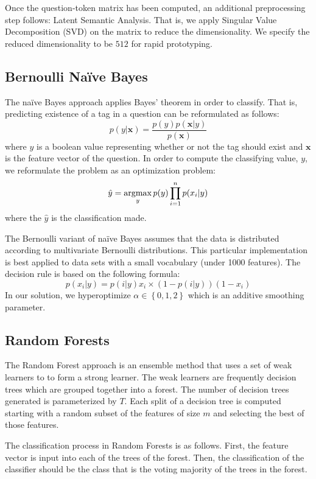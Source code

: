 \documentclass{sig-alternate}
\renewcommand{\vec}[1]{\mathbf{#1}}
\newcommand{\argmax}{\operatornamewithlimits{argmax}}
\begin{document}
		Once the question-token matrix has been computed, an additional
		preprocessing step follows: Latent Semantic Analysis. That is, we apply
		Singular Value Decomposition (SVD) on the matrix to reduce the
		dimensionality. We specify the reduced dimensionality to be $512$ for
		rapid prototyping.

	\subsection{Bernoulli Na\"{i}ve Bayes} %
	\label{sub:Bernoulli Naive Bayes}
		The na\"{i}ve Bayes approach applies Bayes' theorem in order to
		classify. That is, predicting existence of a tag in a question can be
		reformulated as follows:
		\[
			p(y|\vec{x}) = 
				\frac{p(y) p(\vec{x}|y)}
					{p(\vec{x})}
		\]
		where $y$ is a boolean value representing whether or not the tag should
		exist and $\vec{x}$ is the feature vector of the question. In order to
		compute the classifying value, $y$, we reformulate the problem as an
		optimization problem:
		\[
			\hat{y} = \argmax_y p(y) \prod_{i=1}^{n} p(x_i|y)
		\]
		where the $\hat{y}$ is the classification made.
		
		The Bernoulli variant of na\"{i}ve Bayes assumes that the data is
		distributed according to multivariate Bernoulli distributions. This
		particular implementation is best applied to data sets with a small
		vocabulary (under 1000 features).\cite{mccallum1998} The decision rule
		is based on the following formula:
		\[
				p(x_i|y) = p(i|y)x_i \times (1-p(i|y))(1-x_i)
		\]
		In our solution, we hyperoptimize $\alpha \in \left\{0, 1, 2\right\}$
		which is an additive smoothing parameter.

	\subsection{Random Forests} %
	\label{sub:Random Forests}
		The Random Forest approach is an ensemble method that uses a set of weak
		learners to to form a strong learner.\cite{breiman2001} The weak learners are frequently
		decision trees which are grouped together into a forest. The number of
		decision trees generated is parameterized by $T$. Each split of a decision
		tree is computed starting with a random subset of the features of size $m$
		and selecting the best of those features.

		The classification process in Random Forests is as follows. First, the
		feature vector is input into each of the trees of the forest. Then,
		the classification of the classifier should be the class that is the
		voting majority of the trees in the forest.
\end{document}
